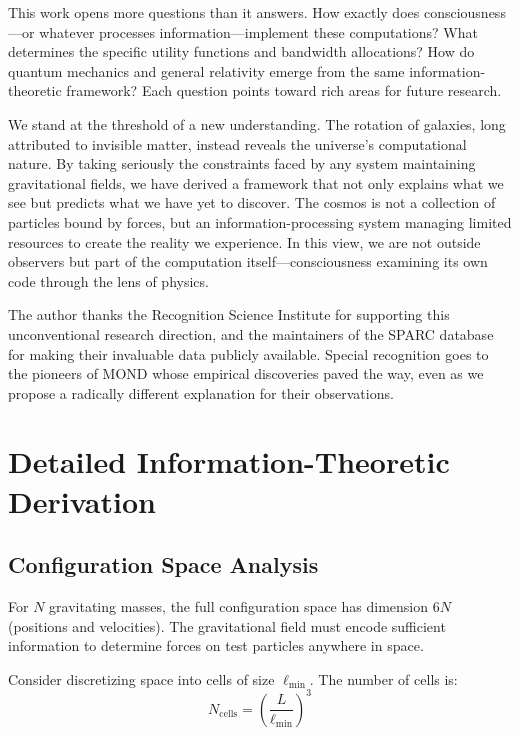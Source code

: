 \documentclass[twocolumn,prd,amsmath,amssymb,aps,superscriptaddress,nofootinbib]{revtex4-2}
\begin{document}
This work opens more questions than it answers. How exactly does consciousness---or whatever processes information---implement these computations? What determines the specific utility functions and bandwidth allocations? How do quantum mechanics and general relativity emerge from the same information-theoretic framework? Each question points toward rich areas for future research.

We stand at the threshold of a new understanding. The rotation of galaxies, long attributed to invisible matter, instead reveals the universe's computational nature. By taking seriously the constraints faced by any system maintaining gravitational fields, we have derived a framework that not only explains what we see but predicts what we have yet to discover. The cosmos is not a collection of particles bound by forces, but an information-processing system managing limited resources to create the reality we experience. In this view, we are not outside observers but part of the computation itself---consciousness examining its own code through the lens of physics.

\acknowledgments

The author thanks the Recognition Science Institute for supporting this unconventional research direction, and the maintainers of the SPARC database for making their invaluable data publicly available. Special recognition goes to the pioneers of MOND whose empirical discoveries paved the way, even as we propose a radically different explanation for their observations.

\appendix

\section{Detailed Information-Theoretic Derivation}

\subsection{Configuration Space Analysis}

For $N$ gravitating masses, the full configuration space has dimension $6N$ (positions and velocities). The gravitational field must encode sufficient information to determine forces on test particles anywhere in space.

Consider discretizing space into cells of size $\ell_{\text{min}}$. The number of cells is:
\begin{equation}
N_{\text{cells}} = \left(\frac{L}{\ell_{\text{min}}}\right)^3
\end{equation}
\end{document}
